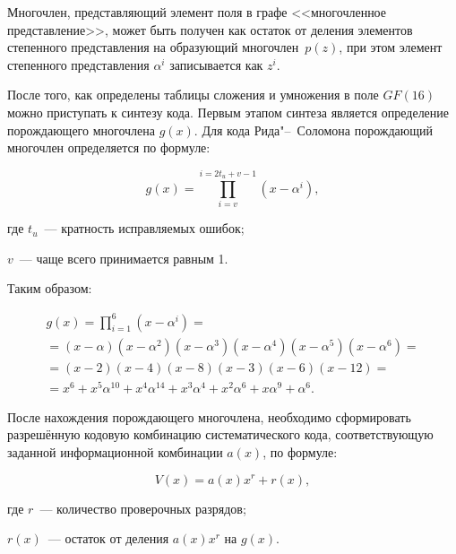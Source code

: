 Многочлен, представляющий элемент поля в графе <<многочленное
представление>>, может быть получен как остаток от деления элементов
степенного представления на образующий многочлен~$p(z)$, при этом
элемент степенного представления $\alpha^i$ записывается как $z^i$.





После того, как определены таблицы сложения и умножения в поле
$GF(16)$ можно приступать к синтезу кода. Первым этапом синтеза
является определение порождающего многочлена $g(x)$. Для кода
Рида"--~Соломона порождающий многочлен определяется по формуле:

\begin{equation*}
  g(x) = \prod_{i = v}^{i = 2t_u + v -1}(x - \alpha^i), 
\end{equation*}

\begin{ESKDexplanation}
\item[где ] $t_u$~--- кратность исправляемых ошибок;
\item $v$~--- чаще всего принимается равным 1.
\end{ESKDexplanation}

Таким образом:

\begin{gather*}
  g(x) = \prod_{i =1}^6 (x - \alpha^i) = \\
  = (x - \alpha)(x - \alpha^2)(x - \alpha^3)(x - \alpha^4)(x - \alpha^5)(x - \alpha^6) = \\
  = (x -2)(x - 4)(x -8)(x-3)(x-6)(x-12) = \\
  = x^6 + x^5\alpha^{10} + x^4\alpha^{14} + x^3\alpha^4 + x^2\alpha^6
  + x\alpha^9 + \alpha^6.
\end{gather*}

После нахождения порождающего многочлена, необходимо сформировать
разрешённую кодовую комбинацию систематического кода, соответствующую
заданной информационной комбинации $a(x)$, по формуле:

\begin{equation*}
  V(x) = a(x)x^r + r(x),
\end{equation*}

\begin{ESKDexplanation}
\item[где ] $r$~--- количество проверочных разрядов;
\item $r(x)$~--- остаток от деления $a(x)x^r$ на $g(x)$.
\end{ESKDexplanation}

